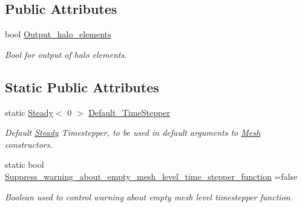 \subsection*{Public Attributes}
\begin{DoxyCompactItemize}
\item 
bool \hyperlink{classoomph_1_1Mesh_a90a3555bd14fdfe3b0c503672f832a43}{Output\+\_\+halo\+\_\+elements}
\begin{DoxyCompactList}\small\item\em Bool for output of halo elements. \end{DoxyCompactList}\end{DoxyCompactItemize}
\subsection*{Static Public Attributes}
\begin{DoxyCompactItemize}
\item 
static \hyperlink{classoomph_1_1Steady}{Steady}$<$ 0 $>$ \hyperlink{classoomph_1_1Mesh_a12243d0fee2b1fcee729ee5a4777ea10}{Default\+\_\+\+Time\+Stepper}
\begin{DoxyCompactList}\small\item\em Default \hyperlink{classoomph_1_1Steady}{Steady} Timestepper, to be used in default arguments to \hyperlink{classoomph_1_1Mesh}{Mesh} constructors. \end{DoxyCompactList}\item 
static bool \hyperlink{classoomph_1_1Mesh_ada6bc12304d1536b747596d1049e48be}{Suppress\+\_\+warning\+\_\+about\+\_\+empty\+\_\+mesh\+\_\+level\+\_\+time\+\_\+stepper\+\_\+function} =false
\begin{DoxyCompactList}\small\item\em Boolean used to control warning about empty mesh level timestepper function. \end{DoxyCompactList}\end{DoxyCompactItemize}
